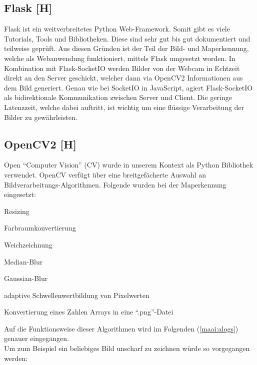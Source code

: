 \subsection{Flask [H]}
Flask ist ein weitverbreitetes Python Web-Framework. Somit gibt es viele Tutorials,
Tools und Bibliotheken. Diese sind sehr gut bis gut dokumentiert und teilweise geprüft.
Aus diesen Gründen ist der Teil der Bild- und Maperkennung, welche
als Webanwendung funktioniert, mittels Flask umgesetzt worden. In Kombination mit Flask-SocketIO werden Bilder von der Webcam
in Echtzeit direkt an den Server geschickt, welcher dann via OpenCV2 Informationen aus dem Bild
generiert. Genau wie bei SocketIO in JavaScript, agiert Flask-SocketIO als bidirektionale
Kommunikation zwischen Server und Client. Die geringe Latenzzeit, welche dabei auftritt,
ist wichtig um eine flüssige Verarbeitung der Bilder zu gewährleisten.

\subsection{OpenCV2 [H]}
Open ``Computer Vision'' (CV) wurde in unserem Kontext als Python Bibliothek verwendet. OpenCV verfügt über eine
breitgefächerte Auswahl an Bildverarbeitungs-Algorithmen.
Folgende wurden bei der Maperkennung eingesetzt:
\begin{compactitem}
    \item Resizing
    \item Farbraumkonvertierung
    \item Weichzeichnung
    \begin{compactitem}
        \item Median-Blur
        \item Gaussian-Blur
    \end{compactitem}
    \item adaptive Schwellenwertbildung von Pixelwerten
    \item Konvertierung eines Zahlen Arrays in eine ``.png''-Datei
\end{compactitem}
Auf die Funktionsweise dieser Algorithmen wird im Folgenden (\ref{maai:alogs}) genauer eingegangen.
\\
Um zum Beispiel ein beliebiges Bild unscharf zu zeichnen würde so vorgegangen werden:\cite{opencvdoc}
\\

